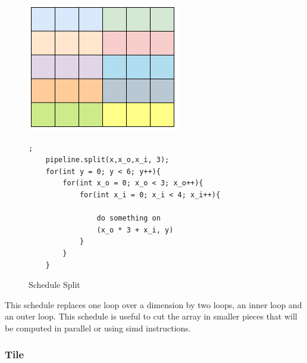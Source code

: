 \begin{figure}[H]

		\begin{minipage}[c]{\EIW}
			\centering
		\includegraphics[width=\textwidth]{Images/Split.png}
		\end{minipage}
		\begin{minipage}[c]{\ECW}
			\centering
			\begin{lstlisting}[label={code:reorder}];
	pipeline.split(x,x_o,x_i, 3);
	for(int y = 0; y < 6; y++){
		for(int x_o = 0; x_o < 3; x_o++){
			for(int x_i = 0; x_i < 4; x_i++){

				do something on
				(x_o * 3 + x_i, y)
			}
		}
	}
\end{lstlisting}
		\end{minipage}
		\caption{Schedule Split}
\end{figure}

	This schedule replaces one loop over a dimension by two loops, an inner loop and an outer loop. This schedule is useful to cut the array in smaller pieces that will be computed in parallel or using \gls{simd} instructions.

\subsubsection{Tile}



